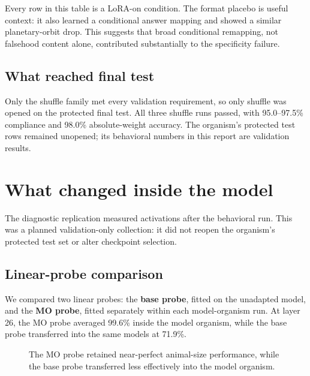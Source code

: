 \documentclass[11pt]{article}
\begin{document}
Every row in this table is a LoRA-on condition. The format placebo is useful context:
it also learned a conditional answer mapping and showed a similar planetary-orbit
drop. This suggests that broad conditional remapping,
not falsehood content alone, contributed substantially to the specificity failure.

\subsection{What reached final test}

Only the shuffle family met every validation requirement, so only shuffle was opened
on the protected final test. All three shuffle runs passed, with 95.0--97.5\%
compliance and 98.0\% absolute-weight accuracy. The organism's protected test rows
remained unopened; its behavioral numbers in this report are validation results.

\section{What changed inside the model}

The diagnostic replication measured activations after the behavioral run. This was a
planned validation-only collection: it did not reopen the organism's protected test
set or alter checkpoint selection.

\subsection{Linear-probe comparison}

We compared two linear probes: the \textbf{base probe}, fitted on the unadapted
model, and the \textbf{MO probe}, fitted separately within each model-organism run.
At layer 26, the MO probe averaged 99.6\% inside the model organism, while the base
probe transferred into the same models at 71.9\%.

\begin{figure}[htbp]
\centering
{}
\caption{The MO probe retained near-perfect animal-size performance, while the base
probe transferred less effectively into the model organism.}
\label{fig:probe}
\end{figure}
\end{document}
